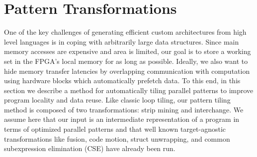 \documentclass[pageno]{jpaper}
\begin{document}
 \section{Pattern Transformations}
\label{transformations}
One of the key challenges of generating efficient custom architectures from high level languages is in coping with arbitrarily large data structures. Since main memory accesses
are expensive and area is limited, our goal is to store a working set in the FPGA's local memory for as long as possible. Ideally, we also want
to hide memory transfer latencies by overlapping communication with computation using hardware blocks which automatically prefetch data.
To this end, in this section we describe a method for automatically tiling parallel patterns to improve program locality and data reuse.
Like classic loop tiling, our pattern tiling method is composed of two transformations: strip mining and interchange.
We assume here that our input is an intermediate representation
of a program in terms of optimized parallel patterns and that well known target-agnostic transformations like fusion, code motion, struct unwrapping, and common subexpression elimination
(CSE) have already been run.
\end{document}
